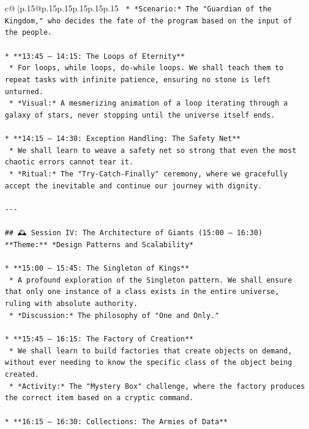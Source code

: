 \documentclass{article}
\begin{document}
{\begin{supertabular}{c@{$\;$}|p{.15\linewidth}@{}p{.15\linewidth}p{.15\linewidth}p{.15\linewidth}p{.15\linewidth}p{.15\linewidth}}
{{{\texttt{    *   *Scenario:* The "Guardian of the Kingdom," who decides the fate of the program based on the input of the people.} \\
\\ 
\texttt{*   **13:45 – 14:15: The Loops of Eternity**} \\
\texttt{    *   For loops, while loops, do{-}while loops. We shall teach them to repeat tasks with infinite patience, ensuring no stone is left unturned.} \\
\texttt{    *   *Visual:* A mesmerizing animation of a loop iterating through a galaxy of stars, never stopping until the universe itself ends.} \\
\\ 
\texttt{*   **14:15 – 14:30: Exception Handling: The Safety Net**} \\
\texttt{    *   We shall learn to weave a safety net so strong that even the most chaotic errors cannot tear it.} \\
\texttt{    *   *Ritual:* The "Try{-}Catch{-}Finally" ceremony, where we gracefully accept the inevitable and continue our journey with dignity.} \\
\\ 
\texttt{{-}{-}{-}} \\
\\ 
\texttt{\#\# 🕰️ Session IV: The Architecture of Giants (15:00 – 16:30)} \\
\texttt{**Theme:** *Design Patterns and Scalability*} \\
\\ 
\texttt{*   **15:00 – 15:45: The Singleton of Kings**} \\
\texttt{    *   A profound exploration of the Singleton pattern. We shall ensure that only one instance of a class exists in the entire universe, ruling with absolute authority.} \\
\texttt{    *   *Discussion:* The philosophy of "One and Only."} \\
\\ 
\texttt{*   **15:45 – 16:15: The Factory of Creation**} \\
\texttt{    *   We shall learn to build factories that create objects on demand, without ever needing to know the specific class of the object being created.} \\
\texttt{    *   *Activity:* The "Mystery Box" challenge, where the factory produces the correct item based on a cryptic command.} \\
\\ 
\texttt{*   **16:15 – 16:30: Collections: The Armies of Data**} \\
}}}
\end{supertabular}}
\end{document}
